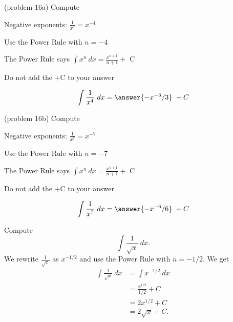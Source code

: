 \documentclass[handout]{ximera}
\begin{document}
\begin{problem}(problem 16a)
Compute 

\begin{hint}
Negative exponents: $\frac{1}{x^4} = x^{-4}$
\end{hint}
\begin{hint}
Use the Power Rule with $n=-4$
\end{hint}
\begin{hint}
The Power Rule says $\int x^n \ dx = \frac{x^{n+1}}{n+1} +$ C
\end{hint}
\begin{hint}
\begin{center}
Do not add the +C to your answer
\end{center}
\end{hint}

\[
\int \frac{1}{x^4} \ dx =
\answer{-x^{-3} /3} \ + C
\]
\end{problem}


\begin{problem}(problem 16b)
Compute 

\begin{hint}
Negative exponents: $\frac{1}{x^7} = x^{-7}$
\end{hint}
\begin{hint}
Use the Power Rule with $n=-7$
\end{hint}
\begin{hint}
The Power Rule says $\int x^n \ dx = \frac{x^{n+1}}{n+1} +$ C
\end{hint}
\begin{hint}
\begin{center}
Do not add the +C to your answer
\end{center}
\end{hint}

\[
\int \frac{1}{x^7} \ dx =
\answer{-x^{-6} /6} \ + C
\]
\end{problem}



\begin{example}[example 17]
Compute $$\int \frac{1}{\sqrt x} \ dx.$$
We rewrite $\frac{1}{\sqrt x}$ as $x^{-1/2}$ and use the Power Rule 
with $n= -1/2$.
We get
\begin{align*}
\int \frac{1}{\sqrt x} \ dx &= \int x^{-1/2} \ dx \\
&= \frac{x^{1/2}}{1/2} + C \\ 
&=  2x^{1/2} + C \\
&= 2\sqrt x +C.
\end{align*} 

\end{example}
\end{document}
